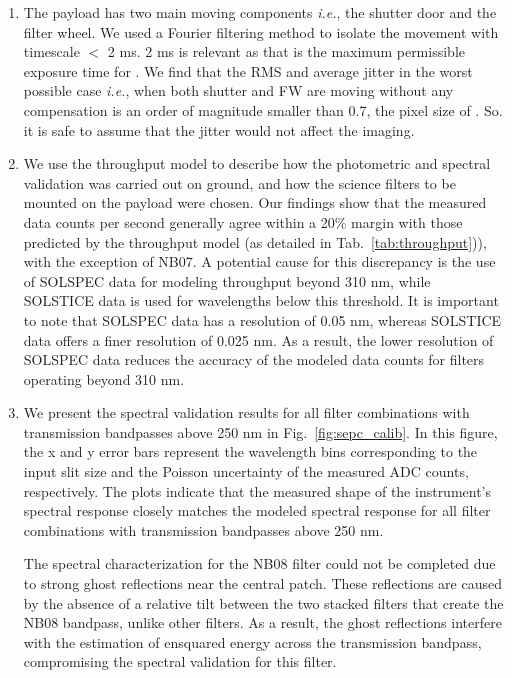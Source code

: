 \begin{enumerate}
    \item The {\suit} payload has two main moving components {\it i.e.}, the shutter door and the filter wheel. We used a Fourier filtering method to isolate the movement with timescale $<$ 2 ms. 2 ms is relevant as that is the maximum permissible exposure time for {\suit}. We find that the RMS and average jitter in the worst possible case {\it i.e.}, when both shutter and FW are moving without any compensation is an order of magnitude smaller than 0.7{\arcsec}, the pixel size of {\suit}. So. it is safe to assume that the jitter would not affect the {\suit} imaging. 
    \item  We use the throughput model to describe how the photometric and spectral validation was carried out on ground, and how the science filters to be mounted on the payload were chosen. Our findings show that the measured data counts per second generally agree within a 20\% margin with those predicted by the throughput model (as detailed in Tab.~\ref{tab:throughput})), with the exception of NB07. A potential cause for this discrepancy is the use of SOLSPEC data for modeling throughput beyond 310 nm, while SOLSTICE data is used for wavelengths below this threshold. It is important to note that SOLSPEC data has a resolution of 0.05 nm, whereas SOLSTICE data offers a finer resolution of 0.025 nm. As a result, the lower resolution of SOLSPEC data reduces the accuracy of the modeled data counts for filters operating beyond 310 nm.
    
    \item We present the spectral validation results for all filter combinations with transmission bandpasses above 250 nm in Fig.~\ref{fig:sepc_calib}. In this figure, the x and y error bars represent the wavelength bins corresponding to the input slit size and the Poisson uncertainty of the measured ADC counts, respectively. The plots indicate that the measured shape of the instrument's spectral response closely matches the modeled spectral response for all filter combinations with transmission bandpasses above 250 nm.

    The spectral characterization for the NB08 filter could not be completed due to strong ghost reflections near the central patch. These reflections are caused by the absence of a relative tilt between the two stacked filters that create the NB08 bandpass, unlike other filters. As a result, the ghost reflections interfere with the estimation of ensquared energy across the transmission bandpass, compromising the spectral validation for this filter.


\end{enumerate}
